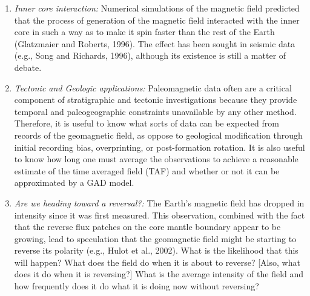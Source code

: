 \begin{enumerate}
\item {\it  Inner core interaction:}
 Numerical simulations of the magnetic field predicted that the process of generation of the magnetic field interacted with the inner core in such a way as to make it spin faster than the rest of the Earth
 (Glatzmaier and Roberts, 1996). \nocite{glatzmaier96}   The effect has been sought in seismic data (e.g., 
 Song and Richards, 1996), \nocite{song96} although  its existence  is still a matter of debate.  



\item {\it Tectonic and Geologic applications: }
Paleomagnetic data often are a critical component of stratigraphic and tectonic investigations because they provide temporal and paleogeographic constraints unavailable by any other method.  Therefore, it is useful to know what sorts of data can be expected from records of the geomagnetic field, as oppose to geological modification through initial recording bias, overprinting,  or post-formation rotation.   It is also useful to know how long one must average the observations to achieve a reasonable estimate of the 
time averaged field (TAF) and whether or not it can be approximated by a 
GAD model.  

\item {\it Are we heading toward a reversal?:}
The Earth's magnetic field has dropped in intensity since it was first measured.  This observation, combined with the fact that the reverse flux patches on the core mantle boundary appear to be growing,  lead to speculation that the geomagnetic field might be starting to reverse its polarity (e.g., Hulot et al., 2002).\nocite{hulot02}  What is the likelihood that this will happen?  What does the field do when it is about to reverse?  [Also, what does it do when it is reversing?] What is the average intensity of the field and how frequently does it do what it is doing now without reversing?  
\end{enumerate}

